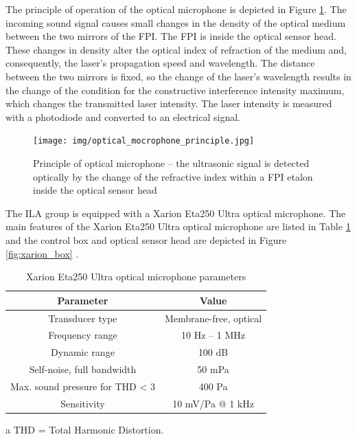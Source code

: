  
 The principle of operation of the optical microphone is depicted in Figure \ref{fig:optical_microphone_principle}. The incoming sound signal causes small changes in the density of the optical medium between the two mirrors of the FPI. The FPI is inside the optical sensor head. These changes in density alter the optical index of refraction of the medium and, consequently, the laser’s propagation speed and wavelength. The distance between the two mirrors is fixed, so the change of the laser’s wavelength results in the change of the condition for the constructive interference intensity maximum, which changes the transmitted laser intensity. The laser intensity is measured with a photodiode and converted to an electrical signal.

\begin{figure}[h]
    \centering
    \texttt{[image: img/optical\_mocrophone\_principle.jpg]}
    \caption{Principle of optical microphone -- the ultrasonic signal is detected optically by the change of the refractive index within a FPI etalon inside the optical sensor head \cite{fischer_rohringer_panzer_hecker_2017}}
    \label{fig:optical_microphone_principle}
\end{figure}

The ILA group is equipped with a Xarion Eta250 Ultra optical microphone. The main features of the Xarion Eta250 Ultra optical microphone are listed in Table \ref{tab:xarionparameters} and the control box and optical sensor head are depicted in Figure \ref{fig:xarion_box} \cite{xarion_eta}. 

\begin{table}[h!] 
\centering
    \begin{threeparttable}
        \begin{tabular}{|c | c|} 
        \hline
            \textbf{Parameter} & \textbf{Value} \\ [0.5ex] 
        \hline
        Transducer type & Membrane-free, optical  \\ 
        \hline
            Frequency range &  10 Hz – 1 MHz \\
        \hline
            Dynamic range & 100 dB  \\
        \hline
            Self-noise, full bandwidth & 50 mPa  \\ 
        \hline
            Max. sound pressure for THD < 3 & 400 Pa \tnote{a} \\
        \hline
            Sensitivity & 10 mV/Pa @ 1 kHz  \\
        \hline
        \end{tabular}
        \begin{tablenotes}
            \small
            \item[a] THD = Total Harmonic Distortion. 
        \end{tablenotes}
        
    \end{threeparttable}
        \caption{Xarion Eta250 Ultra optical microphone parameters \cite{xarion_eta}}
\label{tab:xarionparameters}
\end{table}


